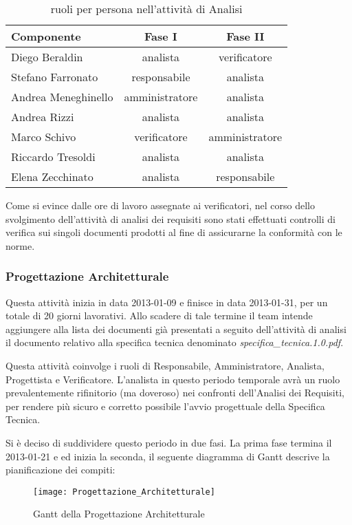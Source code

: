 \begin{table}[h!]
\centering
\begin{tabular}{|l|c|c|}
\hline
Componente& Fase I&Fase II\\
\hline
Diego Beraldin & analista&verificatore\\
Stefano Farronato & responsabile&analista\\
Andrea Meneghinello & amministratore&analista\\
Andrea Rizzi &  analista&analista\\
Marco Schivo & verificatore&amministratore\\
Riccardo Tresoldi & analista&analista\\
Elena Zecchinato & analista&responsabile\\
\hline
\end{tabular}
\caption{ruoli per persona nell'attività di Analisi}\label{tab:ruolian3}
\end{table}

Come si evince dalle ore di lavoro assegnate ai verificatori, nel corso dello svolgimento dell'attività di analisi dei requisiti sono stati effettuati controlli di verifica sui singoli documenti prodotti al fine di assicurarne la conformità con le norme.
\clearpage

\subsubsection{Progettazione Architetturale}
Questa attività inizia in data 2013-01-09 e finisce in data 2013-01-31, per un totale di 20 giorni lavorativi. Allo scadere di tale termine il team intende aggiungere alla lista dei documenti già presentati a seguito dell'attività di analisi il documento relativo alla specifica tecnica denominato \textit{specifica\_tecnica.1.0.pdf}.

Questa attività coinvolge i ruoli di Responsabile, Amministratore, Analista, Progettista e Verificatore.
L'analista in questo periodo temporale avrà un ruolo prevalentemente rifinitorio (ma doveroso) nei confronti dell'Analisi dei Requisiti, per rendere più sicuro e corretto possibile l'avvio progettuale della Specifica Tecnica.

Si è deciso di suddividere questo periodo in due fasi. La prima fase termina il 2013-01-21 e ed inizia la seconda, il seguente diagramma di Gantt descrive la pianificazione dei compiti:

\begin{figure}[h]
  \texttt{[image: Progettazione\_Architetturale]}
\caption{Gantt della Progettazione Architetturale}\label{fig:ganttprog}
\end{figure}

